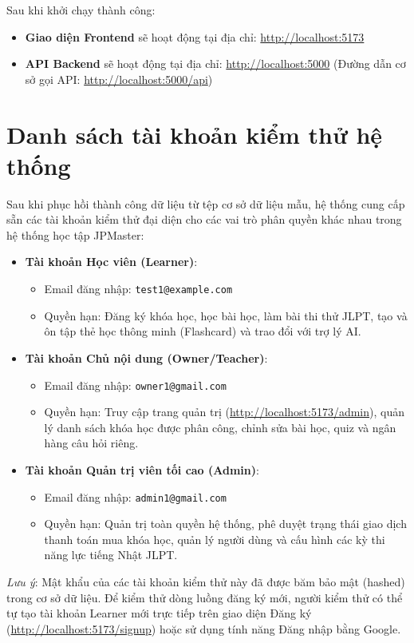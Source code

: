 \documentclass[../DoAn.tex]{subfiles}
\begin{document}
Sau khi khởi chạy thành công:
\begin{itemize}
    \item \textbf{Giao diện Frontend} sẽ hoạt động tại địa chỉ: \url{http://localhost:5173}
    \item \textbf{API Backend} sẽ hoạt động tại địa chỉ: \url{http://localhost:5000} (Đường dẫn cơ sở gọi API: \url{http://localhost:5000/api})
\end{itemize}

\section{Danh sách tài khoản kiểm thử hệ thống}
Sau khi phục hồi thành công dữ liệu từ tệp cơ sở dữ liệu mẫu, hệ thống cung cấp sẵn các tài khoản kiểm thử đại diện cho các vai trò phân quyền khác nhau trong hệ thống học tập JPMaster:

\begin{itemize}
    \item \textbf{Tài khoản Học viên (Learner)}:
    \begin{itemize}
        \item Email đăng nhập: \texttt{test1@example.com}
        \item Quyền hạn: Đăng ký khóa học, học bài học, làm bài thi thử JLPT, tạo và ôn tập thẻ học thông minh (Flashcard) và trao đổi với trợ lý AI.
    \end{itemize}
    
    \item \textbf{Tài khoản Chủ nội dung (Owner/Teacher)}:
    \begin{itemize}
        \item Email đăng nhập: \texttt{owner1@gmail.com}
        \item Quyền hạn: Truy cập trang quản trị (\url{http://localhost:5173/admin}), quản lý danh sách khóa học được phân công, chỉnh sửa bài học, quiz và ngân hàng câu hỏi riêng.
    \end{itemize}
    
    \item \textbf{Tài khoản Quản trị viên tối cao (Admin)}:
    \begin{itemize}
        \item Email đăng nhập: \texttt{admin1@gmail.com}
        \item Quyền hạn: Quản trị toàn quyền hệ thống, phê duyệt trạng thái giao dịch thanh toán mua khóa học, quản lý người dùng và cấu hình các kỳ thi năng lực tiếng Nhật JLPT.
    \end{itemize}
\end{itemize}
\textit{Lưu ý}: Mật khẩu của các tài khoản kiểm thử này đã được băm bảo mật (hashed) trong cơ sở dữ liệu. Để kiểm thử dòng luồng đăng ký mới, người kiểm thử có thể tự tạo tài khoản Learner mới trực tiếp trên giao diện Đăng ký (\url{http://localhost:5173/signup}) hoặc sử dụng tính năng Đăng nhập bằng Google.
\end{document}
